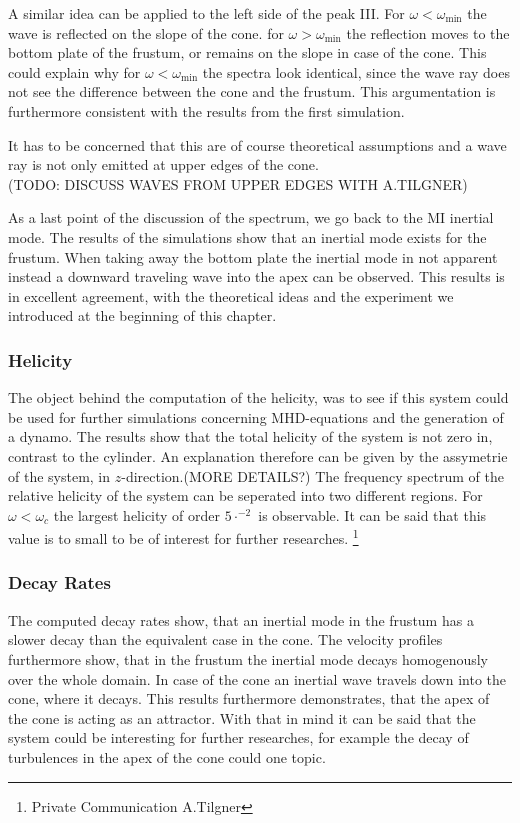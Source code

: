 A similar idea can be applied to the left side of the peak \RN{3}.
For $\omega<\omega_{\text{min}}$ the wave is reflected on the slope of the cone.
for  $\omega>\omega_{\text{min}}$ the reflection moves to the bottom plate of the frustum,
or remains on the slope in case of the cone.
This could explain why for $\omega<\omega_{\text{min}}$  the spectra look identical,
since the wave ray does not see the difference between the cone and the frustum.
This argumentation is furthermore consistent with the results from the first simulation.

It has to be concerned that this are of course theoretical assumptions and a wave ray is not only emitted at
upper edges of the cone.\\ (TODO: DISCUSS WAVES FROM UPPER EDGES WITH A.TILGNER)

As a last point of the discussion of the spectrum, we go back to the M\RN{1} inertial mode.
The results of the simulations show that an inertial mode exists for the frustum.
When taking away the bottom plate the inertial mode in not apparent instead
a downward traveling wave into the apex can be observed.
This results is in excellent agreement, with the theoretical ideas and the experiment we introduced
at the beginning of this chapter.

\clearpage
\subsubsection{Helicity}

The object behind the computation of the helicity, was to see if this system could be used
for further simulations concerning MHD-equations and the generation of a dynamo.
The results show that the total helicity of the system is not zero in, contrast to the cylinder.
An explanation therefore can be given by the assymetrie of the system, in $z$-direction.(MORE DETAILS?)
The frequency spectrum of the relative helicity of the  system can be seperated into two different regions.
For $\omega<\omega_c$ the largest helicity of order $5\cdot^{-2}$ is observable.
It can be said that this value is to small to be of interest for further researches.
\footnote{Private Communication A.Tilgner}


\subsubsection{Decay Rates}

The computed decay rates show, that an inertial mode in the frustum has a slower decay
than the equivalent case in the cone.
The velocity profiles furthermore show, that in the frustum the inertial mode decays homogenously over the whole domain.
In case of the cone an inertial wave travels down into the cone, where it decays.
This results furthermore demonstrates, that the apex of the cone is acting as an attractor.
With that in mind it can be said that the system could be interesting for further researches,
for example the decay of turbulences in the apex of the cone could one topic.

